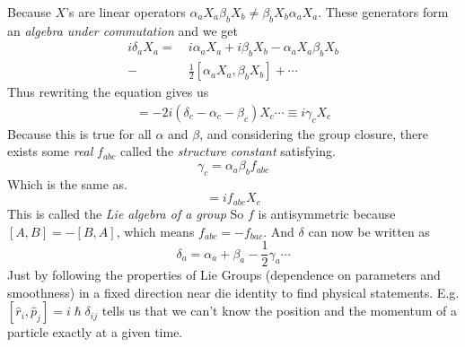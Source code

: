 \documentclass[a4paper]{article}
\theoremstyle{definition}
\theoremstyle{definition}
\theoremstyle{definition}
\theoremstyle{theorem}
\theoremstyle{theorem}
\theoremstyle{theorem}
\theoremstyle{definition}
\begin{document}
    Because $X$'s are linear operators $\alpha _a X_a \beta _b X_b \neq \beta _b X_b \alpha _a X_a$.
    These generators form an \textit{algebra under commutation} and we get
    \begin{align*}
        i\delta _a X_a =&\ i\alpha _a X_a + i\beta _b X_b - \alpha_a X_a \beta _b X_b \\
                    -&\ \frac{1}{2}[\alpha _a X_a, \beta _b X_b] + \cdots
    \end{align*}
    Thus rewriting the equation gives us
    \begin{align*}
        [\alpha _a X_a, \beta _b X_b] = -2i(\delta _c -\alpha _c -\beta _c) X_c \cdots \equiv i\gamma _c X_c
    \end{align*}
    Because this is true for all $\alpha$ and $\beta$, and considering the group closure, there exists some
    \textit{real} $f_{abc}$ called the \textit{structure constant} satisfying.
    \begin{equation}
        \gamma _c = \alpha _a \beta _b f_{abc}
    \end{equation}
    Which is the same as.
    \begin{equation}
        [X_a, X_b] = i f_{abc} X_c
    \end{equation}
    This is called the \textit{Lie algebra of a group}
    \newline
    \newline
    So $f$ is antisymmetric because $[A, B] = -[B, A]$, which means $f_{abc} = -f_{bac}$.
    \newline
    And $\delta$ can now be written as
    \begin{equation}
        \delta _a = \alpha _a + \beta _a - \frac{1}{2} \gamma _a \cdots
    \end{equation}
    Just by following the properties of Lie Groups (dependence on parameters and smoothness) in a fixed
    direction near die identity to find physical statements. E.g.
    $[\hat{r}_i, \hat{p}_j] = i \hslash \delta _{ij}$ tells us that we can't know the position
    and the momentum of a particle exactly at a given time.
\end{document}
